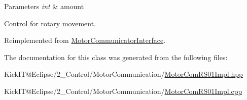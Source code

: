 \begin{DoxyParams}{Parameters}
{\em int} & amount\\
\hline
\end{DoxyParams}
Control for rotary movement. 

Reimplemented from \hyperlink{class_motor_communicator_interface_a9b80ed5df32b6a079326b71832353c41}{Motor\+Communicator\+Interface}.



The documentation for this class was generated from the following files\+:\begin{DoxyCompactItemize}
\item 
Kick\+I\+T@\+Eclipse/2\+\_\+\+Control/\+Motor\+Communication/\hyperlink{_motor_com_r_s01_impl_8hpp}{Motor\+Com\+R\+S01\+Impl.\+hpp}\item 
Kick\+I\+T@\+Eclipse/2\+\_\+\+Control/\+Motor\+Communication/\hyperlink{_motor_com_r_s01_impl_8cpp}{Motor\+Com\+R\+S01\+Impl.\+cpp}\end{DoxyCompactItemize}
